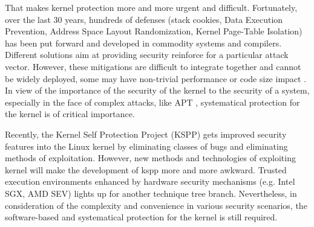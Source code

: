 \documentclass[conference]{IEEEtran}
\begin{document}
That makes kernel protection more and more urgent and difficult. Fortunately, over the last 30 years, hundreds of defenses (stack cookies,
Data Execution Prevention, 
Address Space Layout Randomization, 
Kernel Page-Table Isolation) 
has been put forward and developed in commodity systems and compilers. Different solutions 
aim at providing security reinforce for a particular attack vector. However, these mitigations are difficult to integrate together and cannot be widely deployed, some may have non-trivial performance or code size impact \cite{pauth}.
In view of the importance of the security of the kernel to the security of a system, especially in the face of complex attacks, like APT \cite{apt}, systematical protection for the kernel is of critical importance. 


Recently, the Kernel Self Protection Project (KSPP)\cite{kspp} gets improved security features into the Linux kernel by eliminating classes of bugs and eliminating methods of exploitation. However, new methods and technologies of exploiting kernel will make the development of kspp more and more awkward. Trusted execution environments enhanced by hardware security mechanisms (e.g. Intel SGX, %
AMD SEV) %
lights up for another technique tree branch\cite{sgxcontainer,sgxside}. Nevertheless, in consideration of the complexity and convenience in various security scenarios, the software-based and systematical protection for the kernel is still required.
\end{document}
